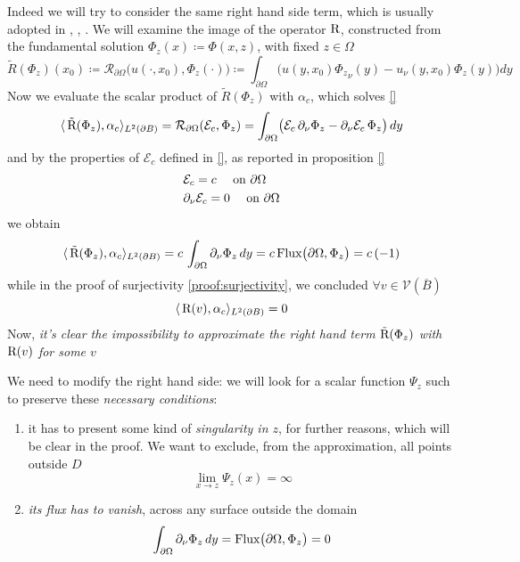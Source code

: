 \documentclass[10pt, a4paper, twoside, openright]{book}
\theoremstyle{definition}
\theoremstyle{plain}
\theoremstyle{plain}
\theoremstyle{plain}
\theoremstyle{plain}
\theoremstyle{plain}
\theoremstyle{plain}
\theoremstyle{plain}
\theoremstyle{plain}
\begin{document}
\par
Indeed we will try to consider the same right hand side term, which is usually adopted in \cite{colton-haddar:rg}, \cite{dicristo-sun:2006}, \cite{dicristo-sun:2007}.
We will examine the image of the operator $\textup{R}$, constructed from the fundamental solution $\Phi_z(x)\coloneqq\Phi(x,z)$, with fixed $z\in\Omega$
\begin{equation}
 \tilde{R}(\Phi_z)(x_0) \coloneqq \mathcal{R}_{\partial\Omega}\bigl(u(\cdot,x_0),\Phi_z(\cdot)\bigr)\coloneqq \int_{\partial \Omega}\bigl(u(y,x_0){\Phi_z}_\nu (y) - u_\nu(y,x_0)\Phi_z(y)\bigr)dy
\end{equation}
Now we evaluate the scalar product of $\tilde{R}(\Phi_z)$ with $\alpha_{c}$, which solves \ref{}
\begin{equation}
 \langle \, \tilde{\textup{R}}(\Phi_z) ,\alpha_{c}\rangle_{L^2(\partial B)}=\mathcal{R}_{\partial \Omega}(\mathcal{E}_{c}, \Phi_z)=\int_{\partial\Omega}\bigl(\mathcal{E}_{c}\,\partial_\nu \Phi_z - \partial_\nu\mathcal{E}_{c}\, \Phi_z\bigr)\,dy
\end{equation}
and by the properties of $\mathcal{E}_{c}$ defined in \ref{}, as reported in proposition \ref{}
\begin{align}
 &\mathcal{E}_{c}=c \quad\textup{ on }\partial\Omega\\
 &\partial_\nu\mathcal{E}_{c}=0\quad \textup{ on }\partial\Omega
\end{align}
we obtain
\begin{equation}
 \langle \, \tilde{\textup{R}}(\Phi_z) ,\alpha_{c}\rangle_{L^2(\partial B)} = c\,\int_{\partial\Omega}\partial_\nu\Phi_z\,dy = c\,\textup{Flux}\bigl(\partial\Omega, \Phi_z\bigr) = c\,(-1)
\end{equation}
while in the proof of surjectivity \ref{proof:surjectivity}, we concluded $\forall v\in\mathcal{V}(\overline{B})$
\begin{equation}
 \langle \, \textup{R}(v) ,\alpha_{c}\rangle_{L^2(\partial B)}=0
\end{equation}
Now, \emph{it's clear the impossibility to approximate the right hand term $\tilde{\textup{R}}(\Phi_z)$ with $\textup{R}(v)$ for some $v$}
\par
We need to modify the right hand side: we will look for a scalar function $\Psi_z$ such to preserve these \emph{necessary conditions}:
\begin{enumerate}
 \item it has to present some kind of \emph{singularity in $z$}, for further reasons, which will be clear in the proof. We want to exclude, from the approximation, all points outside $D$
 \begin{equation}
  \lim_{x\to z}\Psi_z(x) = \infty
 \end{equation}
 \item \emph{its flux has to vanish}, across any surface outside the domain
 \begin{equation}
  \int_{\partial\Omega}\partial_\nu\Phi_z\,dy = \textup{Flux}\bigl(\partial\Omega, \Phi_z\bigr) = 0
 \end{equation}
\end{enumerate}
\end{document}
